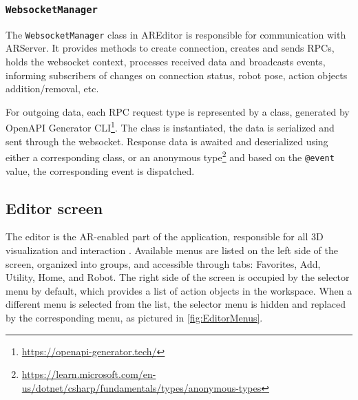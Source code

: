 \subsubsection{\texttt{WebsocketManager}}

The \texttt{WebsocketManager} class in AREditor is responsible for communication with ARServer. It provides methods to create connection, creates and sends RPCs, holds the websocket context, processes received data and broadcasts events, informing subscribers of changes on connection status, robot pose, action objects addition/removal, etc. 

For outgoing data, each RPC request type is represented by a class, generated by OpenAPI Generator CLI\footnote{\href{https://openapi-generator.tech/}{https://openapi-generator.tech/}}. The class is instantiated, the data is serialized and sent through the websocket. Response data is awaited and deserialized using either a corresponding class, or an anonymous type\footnote{\href{https://learn.microsoft.com/en-us/dotnet/csharp/fundamentals/types/anonymous-types}{https://learn.microsoft.com/en-us/dotnet/csharp/fundamentals/types/anonymous-types}} and based on the \texttt{@event} value, the corresponding event is dispatched. 

\subsection{Editor screen}
The editor is the AR-enabled part of the application, responsible for all 3D visualization and interaction . Available menus are listed on the left side of the screen, organized into groups, and accessible through tabs: Favorites, Add, Utility, Home, and Robot. The right side of the screen is occupied by the selector menu by default, which provides a list of action objects in the workspace. When a different menu is selected from the list, the selector menu is hidden and replaced by the corresponding menu, as pictured in \ref{fig:EditorMenus}. 

